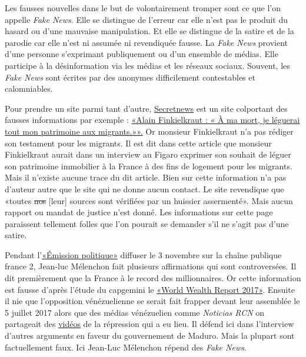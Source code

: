 \documentclass[11pt,a4paper,oldfontcommands]{memoir}
\begin{document}
Les fausses nouvelles dans le but de volontairement tromper sont ce que l'on appelle \textit{Fake News}.
Elle se distingue de l'erreur car elle n'est pas le produit du hasard ou d'une mauvaise manipulation.
Et elle se distingue de la satire et de la parodie car elle n'est ni assumée ni revendiquée fausse.
La \textit{Fake News} provient d'une personne s'exprimant publiquement ou d'un ensemble de médias.
Elle participe à la désinformation via les médias et les réseaux sociaux.
Souvent, les \textit{Fake News} sont écrites par des anonymes difficilement contestables et calomniables.

Pour prendre un site parmi tant d'autre, \href{http://secretnews.fr/}{Secretnews} est un site colportant des fausses informations par exemple :
\href{http://secretnews.fr/2017/06/18/alain-finkielkraut-a-mort-leguerai-patrimoine-aux-migrants/}{«Alain Finkielkraut : « À ma mort, je léguerai tout mon patrimoine aux migrants.»».}
Or monsieur Finkielkraut n'a pas rédiger son testament pour les migrants.
Il est dit dans cette article que monsieur Finkielkraut aurait dans un  interview au Figaro exprimer son souhait de léguer son patrimoine immobilier à la France à des fins de logement pour les migrants.
Mais il n'existe aucune trace du dit article.
Bien sur cette information n'a pas d'auteur autre que le site qui ne donne aucun contact.
Le site revendique que «toutes \sout{nos} [leur] sources sont vérifiées par un huissier assermenté».
Mais aucun rapport ou mandat de justice n'est donné.
Les informations sur cette page paraissent tellement folles que l'on pourait se demander s'il ne s'agit pas d'une satire.

Pendant l'\href{https://www.youtube.com/watch?v=uCPuiSWRq8I}{«Émission politique»} diffuser le 3 novembre sur la chaîne publique france 2, Jean-luc Mélenchon fait plusieurs affirmations qui sont controversées.
Il dit premièrement que la France à le record des millionnaires.
Or cette information est fausse d'après l'étude du capgemini le \href{https://www.worldwealthreport.com/download}{«World Wealth Report 2017»}.
Ensuite il nie que l'opposition vénézuelienne se serait fait frapper devant leur assemblée le 5 juillet 2017 alors que des médias vénézuelien comme \textit{Noticias RCN} on partageait des \href{https://www.noticiasrcn.com/internacional-crisis-venezuela/seguidores-chavistas-irrumpen-violencia-asamblea-nacional}{vidéos} de la répression qui a eu lieu.
Il défend ici dans l'interview d'autres arguments en faveur du gouvernement de Maduro.
Mais la plupart sont factuellement faux.
Ici Jean-Luc Mélenchon répend des \textit{Fake News}.
\end{document}
